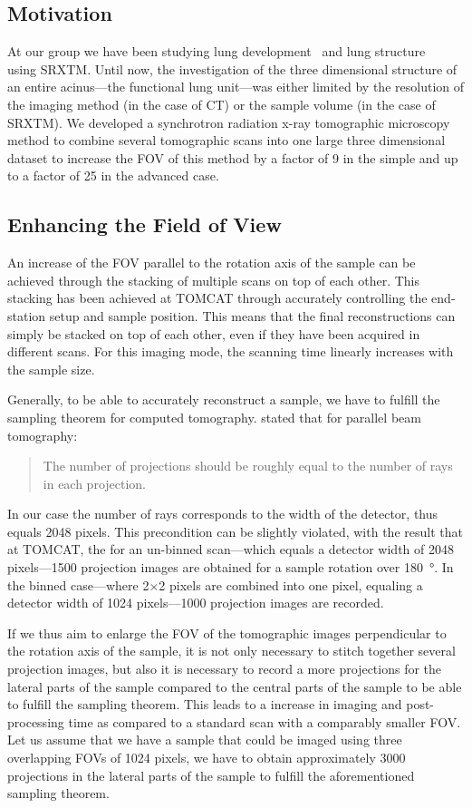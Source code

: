 \subsection{Motivation}
At our group we have been studying lung development~\cite{Schittny2008,Mund2008} and lung structure~\cite{Tsuda2008} using SRXTM. Until now, the investigation of the three dimensional structure of an entire acinus---the functional lung unit---was either limited by the resolution of the imaging method (in the case of \micro CT) or the sample volume (in the case of SRXTM). We developed a synchrotron radiation x-ray tomographic microscopy method to combine several tomographic scans into one large three dimensional dataset to increase the FOV of this method by a factor of 9 in the simple and up to a factor of 25 in the advanced case.

\subsection{Enhancing the Field of View}
\label{subsec:enhancing the field of view}
An increase of the FOV parallel to the rotation axis of the sample can be achieved through the stacking of multiple scans on top of each other. This stacking has been achieved at TOMCAT through accurately controlling the end-station setup and sample position.
This means that the final reconstructions can simply be stacked on top of each other, even if they have been acquired in different scans. For this imaging mode, the scanning time linearly increases with the sample size.

Generally, to be able to accurately reconstruct a sample, we have to fulfill the sampling theorem for computed tomography. \citet{Kak2002} stated that for parallel beam tomography: \begin{quote} The number of projections should be roughly equal to the number of rays in each projection. \end{quote} In our case the number of rays corresponds to the width of the detector, thus equals 2048 pixels. This precondition can be slightly violated, with the result that at TOMCAT, the for an un-binned scan---which equals a detector width of 2048 pixels---1500 projection images are obtained for a sample rotation over \SI{180}{\degree}. In the binned case---where 2$\times$2 pixels are combined into one pixel, equaling a detector width of 1024 pixels---1000 projection images are recorded.

If we thus aim to enlarge the FOV of the tomographic images perpendicular to the rotation axis of the sample, it is not only necessary to stitch together several projection images, but also it is necessary to record a more projections for the lateral parts of the sample compared to the central parts of the sample to be able to fulfill the sampling theorem. This leads to a increase in imaging and post-processing time as compared to a standard scan with a comparably smaller FOV. Let us assume that we have a sample that could be imaged using three overlapping FOVs of 1024 pixels, we have to obtain approximately 3000 projections in the lateral parts of the sample to fulfill the aforementioned sampling theorem. 

